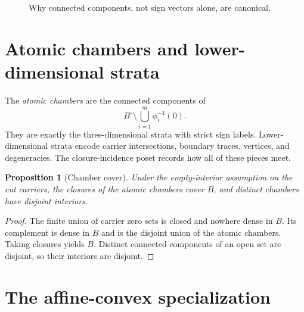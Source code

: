 \documentclass[11pt,openany]{book}
\theoremstyle{polyplain}
\newtheorem{proposition}[theorem]{Proposition}
\theoremstyle{polydef}
\begin{document}
\begin{figure}[htbp]
\centering
{}
\caption{Why connected components, not sign vectors alone, are canonical.}
\label{fig:disconnected-sign}
\end{figure}

\section{Atomic chambers and lower-dimensional strata}

The \emph{atomic chambers} are the connected components of
\[
B^\circ\setminus\bigcup_{i=1}^m \phi_i^{-1}(0).
\]
They are exactly the three-dimensional strata with strict sign labels. Lower-dimensional strata encode carrier intersections, boundary traces, vertices, and degeneracies. The closure-incidence poset records how all of these pieces meet.

\begin{proposition}[Chamber cover]
\label{prop:chamber-cover}
Under the empty-interior assumption on the cut carriers, the closures of the atomic chambers cover $B$, and distinct chambers have disjoint interiors.
\end{proposition}

\begin{proof}
The finite union of carrier zero sets is closed and nowhere dense in $B$. Its complement is dense in $B$ and is the disjoint union of the atomic chambers. Taking closures yields $B$. Distinct connected components of an open set are disjoint, so their interiors are disjoint.
\end{proof}

\section{The affine-convex specialization}
\label{sec:affine-specialization}
\end{document}
